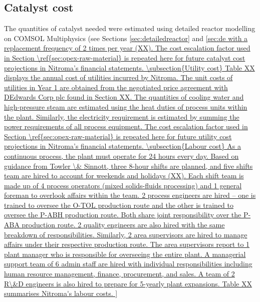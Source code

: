 \subsection{Catalyst cost}
 The quantities of catalyst needed were estimated using detailed reactor modelling on COMSOL Multiphysics (see Sections \ref{sec:detailedreactor} and \ref{sec:de with a replacement frequency of 2 times per year (XX). The cost escalation factor used in Section \ref{sec:opex-raw-material} is repeated here for future catalyst cost projections in Nitroma’s financial statements.  

\subsection{Utility cost}
Table XX displays the annual cost of utilities incurred by Nitroma. The unit costs of utilities in Year 1 are obtained from the negotiated price agreement with DEdwards Corp plc found in Section XX. The quantities of cooling water and high-pressure steam are estimated using the heat duties of process units within the plant. Similarly, the electricity requirement is estimated by summing the power requirements of all process equipment. The cost escalation factor used in Section \ref{sec:opex-raw-material} is repeated here for future utility cost projections in Nitroma’s financial statements.  

\subsection{Labour cost}
As a continuous process, the plant must operate for 24 hours every day. Based on guidance from Towler \& Sinnott, three 8-hour shifts are planned, and five shifts team are hired to account for weekends and holidays (XX). Each shift team is made up of 4 process operators (mixed solids-fluids processing) and 1 general foreman to overlook affairs within the team. 2 process engineers are hired – one is trained to oversee the O-TOL production route and the other is trained to oversee the P-ABH production route. Both share joint responsibility over the P-ABA production route. 2 quality engineers are also hired with the same breakdown of responsibilities.  Similarly, 2 area supervisors are hired to manage affairs under their respective production route. The area supervisors report to 1 plant manager who is responsible for overseeing the entire plant. A managerial support team of 6 admin staff are hired with individual responsibilities including human resource management, finance, procurement, and sales. A team of 2 R\&D engineers is also hired to prepare for 5-yearly plant expansions. Table XX summarises Nitroma's labour costs.

}

